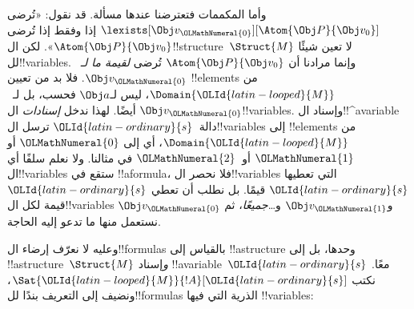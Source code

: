 \documentclass[../../../include/open-logic-section]{subfiles}
\begin{document}
وأما المكممات فتعترضنا عندها مسألة. قد نقول:
«تُرضى $\lexists[\Obj v_{\OLMathNumeral{0}}][\Atom{\Obj P}{\Obj v_0}]$ إذا وفقط
إذا تُرضى $\Atom{\Obj P}{\Obj v_0}$». لكن
ال!!{structure}~$\Struct{M}$ لا تعين شيئًا لل!!{variable}s.
وإنما مرادنا أن $\Atom{\Obj P}{\Obj v_0}$ تُرضى
\emph{لقيمة ما لـ~$\Obj v_{\OLMathNumeral{0}}$}. فلا بد من تعيين
!!{element}s من $\Domain{{\OLId{latin-looped}{M}}}$، ليس لـ$\Obj a$ فحسب، بل
لـ~$\Obj v_{\OLMathNumeral{0}}$ أيضًا. لهذا ندخل \emph{إسنادات} ال!!{variable}s.
وإسناد ال!!^a{variable} دالة~${\OLId{latin-ordinary}{s}}$ ترسل ال!!{variable}s إلى
!!{element}s من $\Domain{{\OLId{latin-looped}{M}}}$، أي إلى ${\OLMathNumeral{0}}$ أو ${\OLMathNumeral{1}}$ أو~${\OLMathNumeral{2}}$ في
مثالنا. ولا نعلم سلفًا أي ال!!{variable}s ستقع في
!!a{formula}، فلا نحصر ال!!{variable}s التي تعطيها ${\OLId{latin-ordinary}{s}}$ قيمًا.
بل نطلب أن تعطي ${\OLId{latin-ordinary}{s}}$ قيمة لكل ال!!{variable}s
$\Obj v_{\OLMathNumeral{0}}$ و$\Obj v_{\OLMathNumeral{1}}$ و\dots\@ \emph{جميعًا}، ثم نستعمل
منها ما تدعو إليه الحاجة.

وعليه لا نعرّف إرضاء ال!!{formula}s بالقياس إلى !!a{structure}
وحدها، بل إلى !!a{structure}~$\Struct{M}$ \emph{و}إسناد
!!a{variable}~${\OLId{latin-ordinary}{s}}$ معًا. نكتب $\Sat{{\OLId{latin-looped}{M}}}{!A}[{\OLId{latin-ordinary}{s}}]$، ونضيف إلى
التعريف بندًا لل!!{formula}s الذرية التي فيها !!{variable}s:
\end{document}
